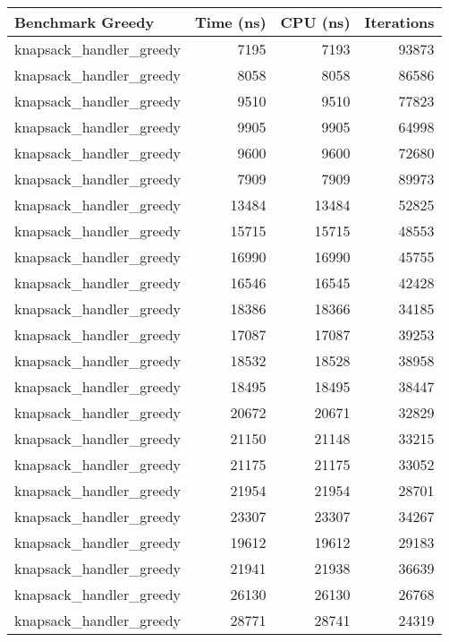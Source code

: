 \documentclass[runningheads]{llncs}
\begin{document}
\begin{table}[h]
    \centering
    \begin{tabular}{@{}lrrr@{}}
        \toprule
        \textbf{Benchmark Greedy} & \textbf{Time (ns)} & \textbf{CPU (ns)} & \textbf{Iterations} \\
        \midrule
        knapsack\_handler\_greedy & 7195 & 7193 & 93873 \\
        knapsack\_handler\_greedy & 8058 & 8058 & 86586 \\
        knapsack\_handler\_greedy & 9510 & 9510 & 77823 \\
        knapsack\_handler\_greedy & 9905 & 9905 & 64998 \\
        knapsack\_handler\_greedy & 9600 & 9600 & 72680 \\
        knapsack\_handler\_greedy & 7909 & 7909 & 89973 \\
        knapsack\_handler\_greedy & 13484 & 13484 & 52825 \\
        knapsack\_handler\_greedy & 15715 & 15715 & 48553 \\
        knapsack\_handler\_greedy & 16990 & 16990 & 45755 \\
        knapsack\_handler\_greedy & 16546 & 16545 & 42428 \\
        knapsack\_handler\_greedy & 18386 & 18366 & 34185 \\
        knapsack\_handler\_greedy & 17087 & 17087 & 39253 \\
        knapsack\_handler\_greedy & 18532 & 18528 & 38958 \\
        knapsack\_handler\_greedy & 18495 & 18495 & 38447 \\
        knapsack\_handler\_greedy & 20672 & 20671 & 32829 \\
        knapsack\_handler\_greedy & 21150 & 21148 & 33215 \\
        knapsack\_handler\_greedy & 21175 & 21175 & 33052 \\
        knapsack\_handler\_greedy & 21954 & 21954 & 28701 \\
        knapsack\_handler\_greedy & 23307 & 23307 & 34267 \\
        knapsack\_handler\_greedy & 19612 & 19612 & 29183 \\
        knapsack\_handler\_greedy & 21941 & 21938 & 36639 \\
        knapsack\_handler\_greedy & 26130 & 26130 & 26768 \\
        knapsack\_handler\_greedy & 28771 & 28741 & 24319 \\

\end{tabular}
\end{table}
\end{document}
